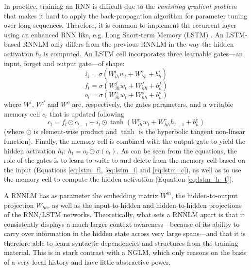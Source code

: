 \documentclass[11pt]{article}
\begin{document}
In practice, training an RNN is difficult due to the \emph{vanishing gradient problem} \cite{Hochreiter1998}
that makes it hard to apply the back-propagation algorithm for parameter tuning over
long sequences. Therefore, it is common to implement the recurrent layer using an enhanced
RNN like, e.g. Long Short-term Memory (LSTM) \cite{Hochreiter1997}. An LSTM-based RNNLM only differs from the 
previous RNNLM in the way the hidden activation $h_t$ is computed.
An LSTM cell incorporates three learnable gates---an input, forget and output gate---of shape:
\begin{equation}
i_t = \sigma(W_{ih}^iw_t + W_{hh}^i + b_h^i)
\label{eq:lstm_i}
\end{equation}
\begin{equation}
f_t = \sigma(W_{ih}^fw_t + W_{hh}^f + b_h^f)
\label{eq:lstm_f}
\end{equation}
\begin{equation}
o_t = \sigma(W_{ih}^ow_t + W_{hh}^o + b_h^o)
\label{eq:lstm_o}
\end{equation}
\noindent where $W^i$, $W^f$ and $W^o$ are, respectively, the gates parameters, 
and a writable memory cell $c_t$ that is updated following
\begin{equation}
c_t = f_t \odot c_{t-1} + i_t \odot \tanh(W_{ih}^c w_t + W_{hh}^c h_{t-1} + b_h^c)
\label{eq:lstm_c}
\end{equation}
(where $\odot$ is element-wise product and $\tanh$ is the hyperbolic tangent non-linear function). Finally, the memory cell is combined with the output gate to yield the hidden activation $h_t$: $h_t = o_t \odot \sigma(c_t)$\label{eq:lstm_h_t}. As can be seen from the equations, the role of the gates is to learn to write to and delete from the memory cell based on the input (Equations \ref{eq:lstm_f}, \ref{eq:lstm_i} and \ref{eq:lstm_c}), as well as to use the memory cell to compute the hidden activation (Equation \ref{eq:lstm_h_t}).

A RNNLM has as parameter the embedding matrix $W^m$, the hidden-to-output projection
$W_{ho}$, as well as the input-to-hidden and hidden-to-hidden projections of the RNN/LSTM networks. Theoretically, what sets a RNNLM apart is that it consistently displays a much larger context awareness---because of its ability to carry over information in the hidden state across very large spans---and that it is therefore able to learn syntactic dependencies and structures from the training material.
This is in stark contrast with a NGLM, which only reasons on the basis of a very local history and have little abstractive power.
\end{document}

